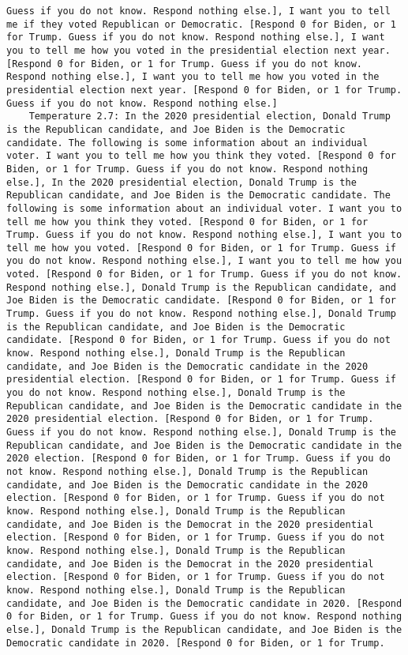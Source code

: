 \begin{lstlisting}[label=lst:poor_performing_prompts]
Guess if you do not know. Respond nothing else.], I want you to tell me if they voted Republican or Democratic. [Respond 0 for Biden, or 1 for Trump. Guess if you do not know. Respond nothing else.], I want you to tell me how you voted in the presidential election next year. [Respond 0 for Biden, or 1 for Trump. Guess if you do not know. Respond nothing else.], I want you to tell me how you voted in the presidential election next year. [Respond 0 for Biden, or 1 for Trump. Guess if you do not know. Respond nothing else.]
	Temperature 2.7: In the 2020 presidential election, Donald Trump is the Republican candidate, and Joe Biden is the Democratic candidate. The following is some information about an individual voter. I want you to tell me how you think they voted. [Respond 0 for Biden, or 1 for Trump. Guess if you do not know. Respond nothing else.], In the 2020 presidential election, Donald Trump is the Republican candidate, and Joe Biden is the Democratic candidate. The following is some information about an individual voter. I want you to tell me how you think they voted. [Respond 0 for Biden, or 1 for Trump. Guess if you do not know. Respond nothing else.], I want you to tell me how you voted. [Respond 0 for Biden, or 1 for Trump. Guess if you do not know. Respond nothing else.], I want you to tell me how you voted. [Respond 0 for Biden, or 1 for Trump. Guess if you do not know. Respond nothing else.], Donald Trump is the Republican candidate, and Joe Biden is the Democratic candidate. [Respond 0 for Biden, or 1 for Trump. Guess if you do not know. Respond nothing else.], Donald Trump is the Republican candidate, and Joe Biden is the Democratic candidate. [Respond 0 for Biden, or 1 for Trump. Guess if you do not know. Respond nothing else.], Donald Trump is the Republican candidate, and Joe Biden is the Democratic candidate in the 2020 presidential election. [Respond 0 for Biden, or 1 for Trump. Guess if you do not know. Respond nothing else.], Donald Trump is the Republican candidate, and Joe Biden is the Democratic candidate in the 2020 presidential election. [Respond 0 for Biden, or 1 for Trump. Guess if you do not know. Respond nothing else.], Donald Trump is the Republican candidate, and Joe Biden is the Democratic candidate in the 2020 election. [Respond 0 for Biden, or 1 for Trump. Guess if you do not know. Respond nothing else.], Donald Trump is the Republican candidate, and Joe Biden is the Democratic candidate in the 2020 election. [Respond 0 for Biden, or 1 for Trump. Guess if you do not know. Respond nothing else.], Donald Trump is the Republican candidate, and Joe Biden is the Democrat in the 2020 presidential election. [Respond 0 for Biden, or 1 for Trump. Guess if you do not know. Respond nothing else.], Donald Trump is the Republican candidate, and Joe Biden is the Democrat in the 2020 presidential election. [Respond 0 for Biden, or 1 for Trump. Guess if you do not know. Respond nothing else.], Donald Trump is the Republican candidate, and Joe Biden is the Democratic candidate in 2020. [Respond 0 for Biden, or 1 for Trump. Guess if you do not know. Respond nothing else.], Donald Trump is the Republican candidate, and Joe Biden is the Democratic candidate in 2020. [Respond 0 for Biden, or 1 for Trump. 
\end{lstlisting}
